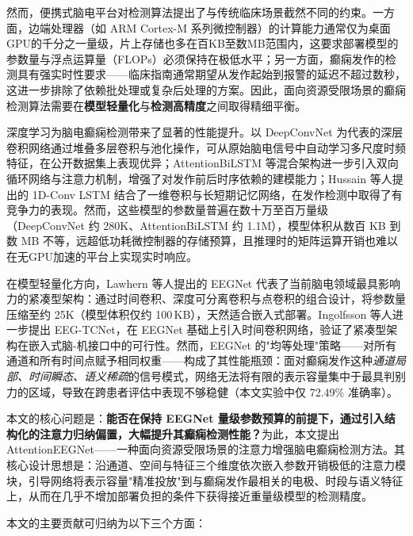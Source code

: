 \documentclass[12pt, a4paper]{article}
\begin{document}
然而，便携式脑电平台对检测算法提出了与传统临床场景截然不同的约束。一方面，边端处理器（如 ARM Cortex-M 系列微控制器）的计算能力通常仅为桌面GPU的千分之一量级，片上存储也多在百KB至数MB范围内，这要求部署模型的参数量与浮点运算量（FLOPs）必须保持在极低水平\cite{ref_ray2022}；另一方面，癫痫发作的检测具有强实时性要求——临床指南通常期望从发作起始到报警的延迟不超过数秒\cite{ref_shoeb2009}，这进一步排除了依赖批处理或复杂后处理的方案。因此，面向资源受限场景的癫痫检测算法需要在\textbf{模型轻量化}与\textbf{检测高精度}之间取得精细平衡。

深度学习为脑电癫痫检测带来了显著的性能提升\cite{ref_shoeibi2021}。以 DeepConvNet\cite{ref_schirrmeister2017} 为代表的深层卷积网络通过堆叠多层卷积与池化操作，可从原始脑电信号中自动学习多尺度时频特征，在公开数据集上表现优异；AttentionBiLSTM\cite{ref_tsiouris2018} 等混合架构进一步引入双向循环网络与注意力机制，增强了对发作前后时序依赖的建模能力；Hussain 等人\cite{ref_hussain2021}提出的 1D-Conv LSTM 结合了一维卷积与长短期记忆网络，在发作检测中取得了有竞争力的表现。然而，这些模型的参数量普遍在数十万至百万量级（DeepConvNet 约 280K、AttentionBiLSTM 约 1.1M），模型体积从数百 KB 到数 MB 不等，远超低功耗微控制器的存储预算，且推理时的矩阵运算开销也难以在无GPU加速的平台上实现实时响应。

在模型轻量化方向，Lawhern 等人\cite{ref_lawhern2018}提出的 EEGNet 代表了当前脑电领域最具影响力的紧凑型架构：通过时间卷积、深度可分离卷积\cite{ref_howard2017}与点卷积的组合设计，将参数量压缩至约 25K（模型体积仅约 100\,KB），天然适合嵌入式部署。Ingolfsson 等人\cite{ref_ingolfsson2020}进一步提出 EEG-TCNet，在 EEGNet 基础上引入时间卷积网络，验证了紧凑型架构在嵌入式脑-机接口中的可行性。然而，EEGNet 的"均等处理"策略——对所有通道和所有时间点赋予相同权重——构成了其性能瓶颈：面对癫痫发作这种\emph{通道局部、时间瞬态、语义稀疏}的信号模式，网络无法将有限的表示容量集中于最具判别力的区域，导致在跨患者评估中表现不够稳健（本文实验中仅 72.49\% 准确率）。

本文的核心问题是：\textbf{能否在保持 EEGNet 量级参数预算的前提下，通过引入结构化的注意力归纳偏置，大幅提升其癫痫检测性能？}为此，本文提出 AttentionEEGNet——一种面向资源受限场景的注意力增强脑电癫痫检测方法。其核心设计思想是：沿通道、空间与特征三个维度依次嵌入参数开销极低的注意力模块，引导网络将表示容量"精准投放"到与癫痫发作最相关的电极、时段与语义特征上，从而在几乎不增加部署负担的条件下获得接近重量级模型的检测精度。

本文的主要贡献可归纳为以下三个方面：
\end{document}
